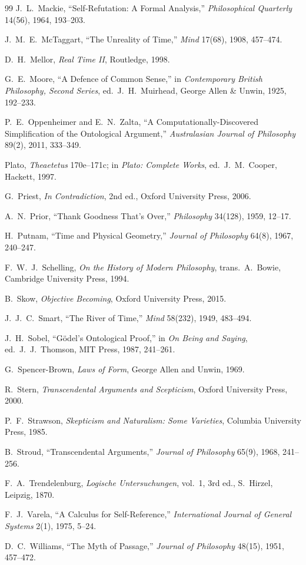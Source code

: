 \documentclass[11pt]{article}
\begin{document}
\begin{thebibliography}{99}
 J.\ L.\ Mackie, ``Self-Refutation: A Formal Analysis,''
\emph{Philosophical Quarterly} 14(56), 1964, 193--203.

 J.\ M.\ E.\ McTaggart, ``The Unreality of Time,''
\emph{Mind} 17(68), 1908, 457--474.

 D.\ H.\ Mellor, \emph{Real Time II}, Routledge, 1998.

 G.\ E.\ Moore, ``A Defence of Common Sense,'' in
\emph{Contemporary British Philosophy, Second Series}, ed.\ J.\ H.\ Muirhead,
George Allen \& Unwin, 1925, 192--233.

 P.\ E.\ Oppenheimer and E.\ N.\ Zalta, ``A
Computationally-Discovered Simplification of the Ontological Argument,''
\emph{Australasian Journal of Philosophy} 89(2), 2011, 333--349.

 Plato, \emph{Theaetetus} 170e--171c; in \emph{Plato: Complete
Works}, ed.\ J.\ M.\ Cooper, Hackett, 1997.

 G.\ Priest, \emph{In Contradiction}, 2nd ed., Oxford
University Press, 2006.

 A.\ N.\ Prior, ``Thank Goodness That's Over,''
\emph{Philosophy} 34(128), 1959, 12--17.

 H.\ Putnam, ``Time and Physical Geometry,'' \emph{Journal
of Philosophy} 64(8), 1967, 240--247.

 F.\ W.\ J.\ Schelling, \emph{On the History of Modern
Philosophy}, trans.\ A.\ Bowie, Cambridge University Press, 1994.

 B.\ Skow, \emph{Objective Becoming}, Oxford University Press,
2015.

 J.\ J.\ C.\ Smart, ``The River of Time,'' \emph{Mind}
58(232), 1949, 483--494.

 J.\ H.\ Sobel, ``G\"odel's Ontological Proof,'' in
\emph{On Being and Saying}, ed.\ J.\ J.\ Thomson, MIT Press, 1987, 241--261.

 G.\ Spencer-Brown, \emph{Laws of Form}, George Allen
and Unwin, 1969.

 R.\ Stern, \emph{Transcendental Arguments and Scepticism},
Oxford University Press, 2000.

 P.\ F.\ Strawson, \emph{Skepticism and Naturalism: Some
Varieties}, Columbia University Press, 1985.

 B.\ Stroud, ``Transcendental Arguments,'' \emph{Journal of
Philosophy} 65(9), 1968, 241--256.

 F.\ A.\ Trendelenburg, \emph{Logische
Untersuchungen}, vol.\ 1, 3rd ed., S.\ Hirzel, Leipzig, 1870.

 F.\ J.\ Varela, ``A Calculus for Self-Reference,''
\emph{International Journal of General Systems} 2(1), 1975, 5--24.

 D.\ C.\ Williams, ``The Myth of Passage,'' \emph{Journal
of Philosophy} 48(15), 1951, 457--472.

\end{thebibliography}
\end{document}
